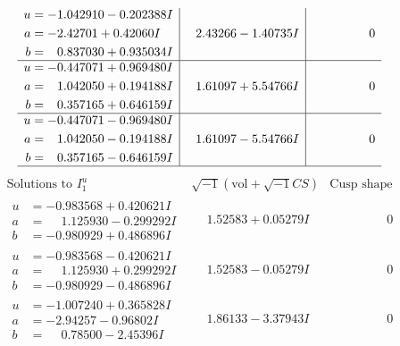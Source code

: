 \documentclass[1p]{elsarticle_modified}
\theoremstyle{definition}
\newcommand{\I}{\sqrt{-1}}
\begin{document}
$$\begin{array}{c|c|c}
\begin{aligned}
u &= -1.042910 - 0.202388 I \\
a &= -2.42701 + 0.42060 I \\
b &= \phantom{-}0.837030 + 0.935034 I\end{aligned}
 & \phantom{-}2.43266 - 1.40735 I & \phantom{-0.000000 } 0 \\ \hline\begin{aligned}
u &= -0.447071 + 0.969480 I \\
a &= \phantom{-}1.042050 + 0.194188 I \\
b &= \phantom{-}0.357165 + 0.646159 I\end{aligned}
 & \phantom{-}1.61097 + 5.54766 I & \phantom{-0.000000 } 0 \\ \hline\begin{aligned}
u &= -0.447071 - 0.969480 I \\
a &= \phantom{-}1.042050 - 0.194188 I \\
b &= \phantom{-}0.357165 - 0.646159 I\end{aligned}
 & \phantom{-}1.61097 - 5.54766 I & \phantom{-0.000000 } 0\\
 \hline 
 \end{array}$$\newpage$$\begin{array}{c|c|c}  
\text{Solutions to }I^u_{1}& \I (\text{vol} + \sqrt{-1}CS) & \text{Cusp shape}\\
 \hline 
\begin{aligned}
u &= -0.983568 + 0.420621 I \\
a &= \phantom{-}1.125930 - 0.299292 I \\
b &= -0.980929 + 0.486896 I\end{aligned}
 & \phantom{-}1.52583 + 0.05279 I & \phantom{-0.000000 } 0 \\ \hline\begin{aligned}
u &= -0.983568 - 0.420621 I \\
a &= \phantom{-}1.125930 + 0.299292 I \\
b &= -0.980929 - 0.486896 I\end{aligned}
 & \phantom{-}1.52583 - 0.05279 I & \phantom{-0.000000 } 0 \\ \hline\begin{aligned}
u &= -1.007240 + 0.365828 I \\
a &= -2.94257 - 0.96802 I \\
b &= \phantom{-}0.78500 - 2.45396 I\end{aligned}
 & \phantom{-}1.86133 - 3.37943 I & \phantom{-0.000000 } 0 \\ \hline\begin{aligned}

\end{aligned}
\end{array}$$
\end{document}
